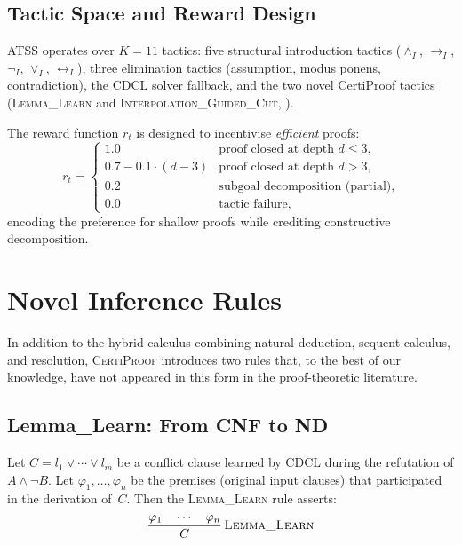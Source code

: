 \documentclass[acmtocl,review,anonymous]{acmart}
\newcommand{\CP}{\textsc{CertiProof}}
\newcommand{\ATSS}{\textsc{ATSS}}
\newcommand{\infrule}[3]{
  \dfrac{\displaystyle #2}{\displaystyle #3}\,\textsc{#1}
}
\begin{document}
\subsection{Tactic Space and Reward Design}

\ATSS{} operates over $K=11$ tactics: five structural introduction
tactics ($\land_I$, $\to_I$, $\neg_I$, $\lor_I$, $\leftrightarrow_I$),
three elimination tactics (assumption, modus ponens, contradiction),
the CDCL solver fallback, and the two novel CertiProof tactics
(\textsc{Lemma\_Learn} and \textsc{Interpolation\_Guided\_Cut},
).

The reward function $r_t$ is designed to incentivise \emph{efficient}
proofs:
\begin{equation}
  r_t =
  \begin{cases}
    1.0                           & \text{proof closed at depth } d \le 3, \\
    0.7 - 0.1 \cdot (d - 3)      & \text{proof closed at depth } d > 3, \\
    0.2                           & \text{subgoal decomposition (partial)}, \\
    0.0                           & \text{tactic failure},
  \end{cases}
\end{equation}
encoding the preference for shallow proofs while crediting
constructive decomposition.

\section{Novel Inference Rules}
\label{sec:novel-rules}

In addition to the hybrid calculus combining natural deduction,
sequent calculus, and resolution, \CP{} introduces two rules that,
to the best of our knowledge, have not appeared in this form in
the proof-theoretic literature.

\subsection{Lemma\_Learn: From CNF to ND}

\begin{definition}
  \label{def:lemma-learn}
  Let $C = l_1 \lor \cdots \lor l_m$ be a conflict clause learned by
  CDCL during the refutation of $A \land \neg B$.  Let $\varphi_1,
  \dots, \varphi_n$ be the premises (original input clauses) that
  participated in the derivation of~$C$.  Then the
  \textsc{Lemma\_Learn} rule asserts:
  \begin{equation}
    \infrule{\textsc{Lemma\_Learn}}
          {\varphi_1 \quad \cdots \quad \varphi_n}
          {C}
  \end{equation}
\end{definition}
\end{document}
